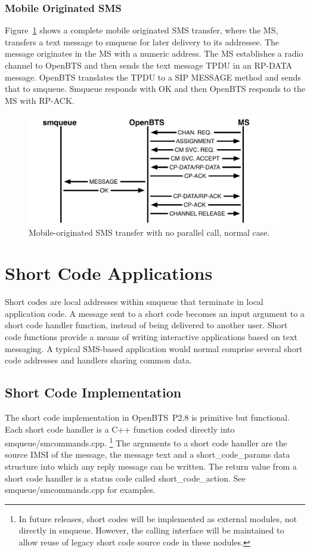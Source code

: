 \documentclass[11pt,openany]{book}
\begin{document}
\subsubsection{Mobile Originated SMS}
Figure~\ref{fig:MOSMSLadder} shows a complete mobile originated SMS transfer, where the MS, transfers a text message to smqueue for later delivery to its addressee.  The message originates in the MS with a numeric address.  The MS establishes a radio channel to OpenBTS and then sends the text message TPDU in an RP-DATA message.  OpenBTS translates the TPDU to a SIP MESSAGE method and sends that to smqueue.  Smqueue responds with OK and then OpenBTS responds to the MS with RP-ACK.

\begin{figure}[htbp]
\begin{center}
\includegraphics[width=6in]{MOSMSLadder.pdf}
\caption{Mobile-originated SMS transfer with no parallel call, normal case.}
\label{fig:MOSMSLadder}
\end{center}
\end{figure}


\section{Short Code Applications}
\label{sec:shortCodes}
Short codes are local addresses within smqueue that terminate in local application code.  A message sent to a short code becomes an input argument to a short code handler function, instead of being delivered to another user. Short code functions provide a means of writing interactive applications based on text messaging.
A typical SMS-based application would normal comprise several short code addresses and handlers sharing common data.

\subsection{Short Code Implementation}
The short code implementation in OpenBTS~P2.8 is primitive but functional.  Each short code handler is a C++ function coded directly into smqueue/smcommands.cpp.%
\footnote{In future releases, short codes will be implemented as external modules, not directly in smqueue.  However, the calling interface will be maintained to allow reuse of legacy short code source code in these nodules.}
The arguments to a short code handler are the source IMSI of the message, the message text and a short\_code\_params data structure into which any reply message can be written.  The return value from a short code handler is a status code called short\_code\_action.  See smqueue/smcommands.cpp for examples.%
\end{document}

